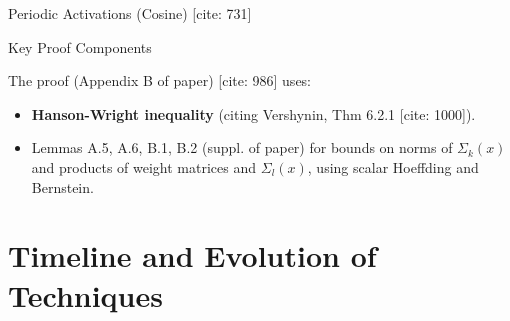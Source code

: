 \documentclass{beamer}
\theoremstyle{definition}
\theoremstyle{remark}
\begin{document}
\begin{frame}{Periodic Activations (Cosine) [cite: 731]}
\begin{block}{Key Proof Components}
\begin{itemize}
        The proof (Appendix B of paper) [cite: 986] uses:
        \begin{itemize}
          \item \textbf{Hanson-Wright inequality} (citing Vershynin, Thm 6.2.1 [cite: 1000]).
          \item Lemmas A.5, A.6, B.1, B.2 (suppl. of paper) for bounds on norms of $\Sigma_k(x)$ and products of weight matrices and $\Sigma_l(x)$, using scalar Hoeffding and Bernstein.
        \end{itemize}
    \end{itemize}
  \end{block}
\end{frame}

\section{Timeline and Evolution of Techniques}
\end{document}
